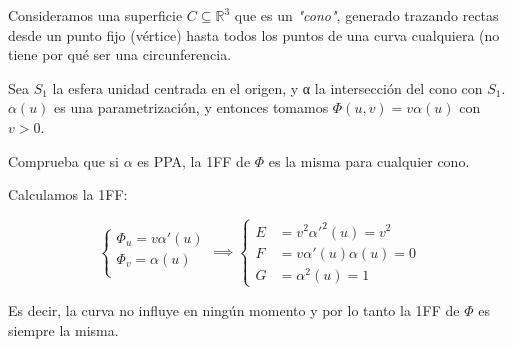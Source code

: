 \begin{problem}[1] Consideramos una superficie $C⊆ℝ^3$ que es un \textit{"cono"}, generado trazando rectas desde un punto fijo (vértice) hasta todos los puntos de una curva cualquiera (no tiene por qué ser una circunferencia.

Sea $S_1$ la esfera unidad centrada en el origen, y α la intersección del cono con $S_1$. $α(u)$ es una parametrización, y entonces tomamos $Φ(u,v) = vα(u)$ con $v>0$.

Comprueba que si $α$ es PPA, la 1FF de $Φ$ es la misma para cualquier cono.

\solution

Calculamos la 1FF:

\[ \begin{cases}
Φ_u = vα'(u) \\
Φ_v = α(u) \\
\end{cases}\implies \begin{cases}
E &= v^2α'^2(u) = v^2 \\
F &= vα'(u)α(u) = 0\\
G &= α^2(u) = 1
\end{cases} \]

Es decir, la curva no influye en ningún momento y por lo tanto la 1FF de $Φ$ es siempre la misma.
\end{problem}

